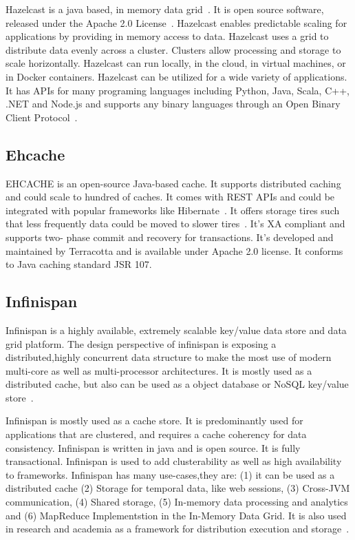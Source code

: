 Hazelcast is a java based, in memory data grid~\cite{www-wikihazel}.
It is open source software, released under the Apache 2.0
License~\cite{www-githubhazel}. Hazelcast enables predictable scaling
for applications by providing in memory access to data.  Hazelcast
uses a grid to distribute data evenly across a cluster. Clusters allow
processing and storage to scale horizontally. Hazelcast can run
locally, in the cloud, in virtual machines, or in Docker
containers. Hazelcast can be utilized for a wide variety of
applications. It has APIs for many programing languages including
Python, Java, Scala, C++, .NET and Node.js and supports any binary
languages through an Open Binary Client Protocol~\cite{www-wikihazel}.

\subsection{Ehcache}

EHCACHE is an open-source Java-based cache. It supports distributed
caching and could scale to hundred of caches. It comes with REST APIs
and could be integrated with popular frameworks like
Hibernate~\cite{www-ehcache-features}. It offers storage tires such
that less frequently data could be moved to slower
tires~\cite{www-ehcache-documentation}. It's XA compliant and supports
two- phase commit and recovery for transactions. It's developed and
maintained by Terracotta and is available under Apache 2.0 license.
It conforms to Java caching standard JSR 107.

\subsection{Infinispan}

Infinispan is a highly available, extremely scalable key/value data
store and data grid platform. The design perspective of infinispan is
exposing a distributed,highly concurrent data structure to make the
most use of modern multi-core as well as multi-processor
architectures. It is mostly used as a distributed cache, but also can
be used as a object database or NoSQL key/value
store~\cite{infinispan.org}.

Infinispan is mostly used as a cache store. It is predominantly used
for applications that are clustered, and requires a cache coherency
for data consistency. Infinispan is written in java and is open
source. It is fully transactional. Infinispan is used to add
clusterability as well as high availability to frameworks.  Infinispan
has many use-cases,they are: (1) it can be used as a distributed cache
(2) Storage for temporal data, like web sessions, (3) Cross-JVM
communication, (4) Shared storage, (5) In-memory data processing and
analytics and (6) MapReduce Implementstion in the In-Memory Data
Grid. It is also used in research and academia as a framework for
distribution execution and storage~\cite{infinispan_wikipedia}.
     
